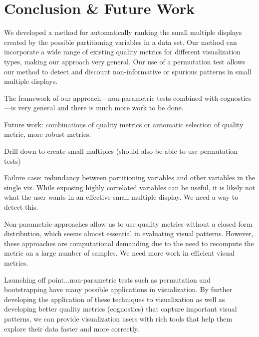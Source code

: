 \section{Conclusion \& Future Work}

We developed a method for automatically ranking the small multiple displays created by the possible partitioning variables in a data set. Our method can incorporate a wide range of existing quality metrics for different visualization types, making our approach very general. Our use of a permutation test allows our method to detect and discount non-informative or spurious patterns in small multiple displays.

The framework of our approach---non-parametric tests combined with cognostics---is very general and there is much more work to be done.

Future work: combinations of quality metrics or automatic selection of quality metric, more robust metrics.

Drill down to create small multiples (should also be able to use permutation tests)

Failure case: redundancy between partitioning variables and other variables in the single viz. While exposing highly correlated variables can be useful, it is likely not what the user wants in an effective small multiple display. We need a way to detect this.

Non-parametric approaches allow us to use quality metrics without a closed form distribution, which seems almost essential in evaluating visual patterns. However, these approaches are computational demanding due to the need to recompute the metric on a large number of samples. We need more work in efficient visual metrics.

Launching off point...non-parametric tests such as permutation and bootstrapping have many possible applications in visualization. By further developing the application of these techniques to visualization as well as developing better quality metrics (cognostics) that capture important visual patterns, we can provide visualization users with rich tools that help them explore their data faster and more correctly.
